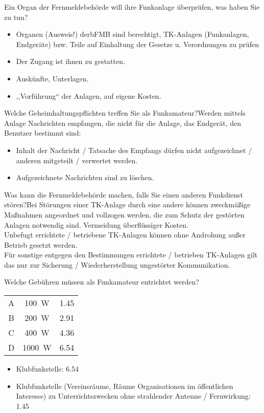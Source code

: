 \documentclass[avery5371,grid,frame,a4paper]{flashcards}
\newcommand{\card}[3]{
  \begin{flashcard}[{\chap} -- #1]{#2}#3\end{flashcard}
}
\begin{document}
\card{14}{Ein Organ der Fernmeldebehörde will ihre Funkanlage überprüfen, was haben Sie zu tun?}{\begin{itemize}\itemsep1pt \item Organen (Ausweis!) derbFMB sind berechtigt, TK-Anlagen (Funkanlagen, Endgeräte) bzw. Teile auf Einhaltung der Gesetze u. Verordnungen zu prüfen \item Der Zugang ist ihnen zu gestatten. \item Auskünfte, Unterlagen. \item			,,Vorführung`` der Anlagen, auf eigene Kosten. \end{itemize}}

\card{14}{ Welche Geheimhaltungspflichten treffen Sie als Funkamateur?}{Werden mittels Anlage Nachrichten empfangen, die nicht für die Anlage, das Endgerät, den Benutzer bestimmt sind:\begin{itemize}\itemsep1pt \item Inhalt der Nachricht / Tatsache des Empfangs dürfen nicht aufgezeichnet / anderen mitgeteilt / verwertet	werden. \item Aufgezeichnete Nachrichten sind zu löschen.\end{itemize}}

\card{16}{Was kann die Fernmeldebehörde machen, falls Sie einen anderen Funkdienst stören?}{Bei Störungen einer TK-Anlage durch eine andere können zweckmäßige Maßnahmen angeordnet und vollzogen werden, die zum Schutz der gestörten	Anlagen notwendig sind. Vermeidung überflüssiger Kosten. \\ Unbefugt errichtete / betriebene TK-Anlagen können ohne Androhung außer Betrieb gesetzt werden. \\ Für sonstige entgegen den Bestimmungen errichtete / betrieben TK-Anlagen gilt das nur zur Sicherung / Wiederherstellung ungestörter Kommunikation.}

\card{17}{Welche Gebühren müssen als Funkamateur entrichtet werden?}{
  \begin{tabular}{ccc}
    A & \SI{100}{\watt} & \SI{1,45}{\EUR} \\
    B & \SI{200}{\watt} & \SI{2,91}{\EUR} \\
    C & \SI{400}{\watt} & \SI{4,36}{\EUR} \\
    D & \SI{1000}{\watt} & \SI{6,54}{\EUR}
  \end{tabular}
  \begin{itemize}
    \item Klubfunkstelle: \SI{6,54}{\EUR}
    \item Klubfunkstelle (Vereinsräume, Räume Organisationen im öffentlichen Interesse) zu Unterrichtszwecken ohne strahlender Antenne / Fernwirkung: \SI{1,45}{\EUR}
  \end{itemize}
}
\end{document}
